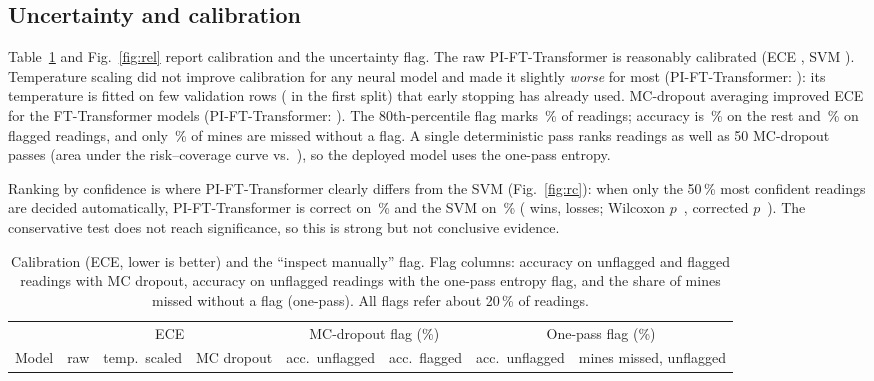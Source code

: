 \documentclass[conference]{IEEEtran}
\newcommand{\pift}{PI-FT-Transformer}
\begin{document}
\subsection{Uncertainty and calibration}
Table~\ref{tab:unc} and Fig.~\ref{fig:rel} report calibration and the uncertainty flag. The raw \pift{} is reasonably calibrated (ECE \vEcePiFt, SVM \vEceSvm). Temperature scaling did not improve calibration for any neural model and made it slightly \emph{worse} for most (\pift: \vEcetsPiFt): its temperature is fitted on few validation rows (\vValFirst{} in the first split) that early stopping has already used. MC-dropout averaging improved ECE for the FT-Transformer models (\pift: \vEcemcPiFt). The 80th-percentile flag marks \vUncPiFtMcFlaggedShare\,\% of readings; accuracy is \vUncPiFtMcAccuracyConfident\,\% on the rest and \vUncPiFtMcAccuracyFlagged\,\% on flagged readings, and only \vUncPiFtMcMineMissedUnflagged\,\% of mines are missed without a flag. A single deterministic pass ranks readings as well as 50 MC-dropout passes (area under the risk--coverage curve \vUncPiFtSmAurc{} vs.\ \vUncPiFtMcAurc), so the deployed model uses the one-pass entropy.

Ranking by confidence is where \pift{} clearly differs from the SVM (Fig.~\ref{fig:rc}): when only the 50\,\% most confident readings are decided automatically, \pift{} is correct on \vSelPiFtMcFifty\,\% and the SVM on \vSelSvmMpFifty\,\% (\vSelwinsSvmAccAtFiveZero{} wins, \vSellossesSvmAccAtFiveZero{} losses; Wilcoxon $p$~\vSelpwSvmAccAtFiveZero, corrected $p$~\vSelpSvmAccAtFiveZero). The conservative test does not reach significance, so this is strong but not conclusive evidence.

\begin{table}[t]
\centering
\caption{Calibration (ECE, lower is better) and the ``inspect manually'' flag. Flag columns: accuracy on unflagged and flagged readings with MC dropout, accuracy on unflagged readings with the one-pass entropy flag, and the share of mines missed without a flag (one-pass). All flags refer about 20\,\% of readings.}
\label{tab:unc}
\footnotesize
\begin{tabular}{lccccccc}
\toprule
 & \multicolumn{3}{c}{ECE} & \multicolumn{2}{c}{MC-dropout flag (\%)} & \multicolumn{2}{c}{One-pass flag (\%)} \\
Model & raw & temp.\ scaled & MC dropout & acc.\ unflagged & acc.\ flagged & acc.\ unflagged & mines missed, unflagged \\
\midrule

\end{tabular}
\end{table}
\end{document}
